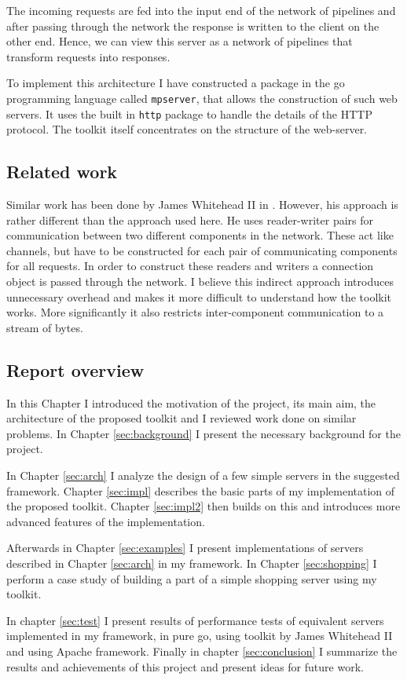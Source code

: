 The incoming requests are fed into the input end of the network of pipelines and 
after passing through the network the response is written to the
client on the other end. Hence, we can view this server
as a network of pipelines that transform requests into responses.

To implement this architecture I have constructed a package in the go programming 
language called \texttt{mpserver}, that allows the construction of such web servers.
It uses the built in \texttt{http} package to handle the details of
the HTTP \cite{http} protocol. The toolkit itself concentrates on the 
structure of the web-server.


\subsection{Related work}
Similar work has been done by James Whitehead II in \cite{whitehead}.
However, his approach is rather different than the approach used 
here. He uses reader-writer pairs for communication between
two different components in the network. These act like channels, but
have to be constructed for each pair of communicating components
for all requests.
In order to construct these readers and writers a connection object is 
passed through the network.
I believe this indirect approach introduces unnecessary overhead and 
makes it more difficult to understand how the toolkit works.
More significantly it also restricts inter-component communication 
to a stream of bytes.

\subsection{Report overview}
In this Chapter I introduced the motivation of the project, its main
aim, the architecture of the proposed toolkit and I reviewed work done
on similar problems. In Chapter \ref{sec:background}
I present the necessary background for the project.

In Chapter \ref{sec:arch} I analyze the design of a few simple servers
in the suggested framework. Chapter \ref{sec:impl} describes the basic parts of 
my implementation of the proposed toolkit. Chapter \ref{sec:impl2} then builds
on this and introduces more advanced features of the implementation.

Afterwards in Chapter \ref{sec:examples} I present
implementations of servers described in Chapter \ref{sec:arch} in my framework.
In Chapter \ref{sec:shopping} I perform a case study of building
a part of a simple shopping server using my toolkit.

In chapter \ref{sec:test} I present results of performance tests of equivalent 
servers implemented in my framework, in pure go, using toolkit by James Whitehead II
\cite{whitehead} and using Apache framework. Finally in chapter 
\ref{sec:conclusion} I summarize the results and achievements of this 
project and present ideas for future work.